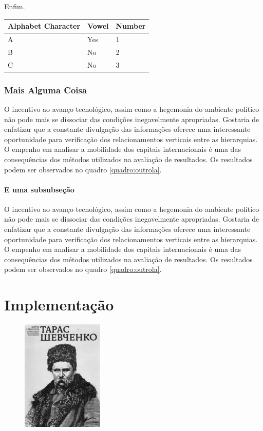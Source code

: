 \documentclass[font=plain,chapter=TITLE,section=Title,espaco=duplo,tocpage=plain,appendix=Name,floatnumber=continuous]{abnt}
\begin{document}
Enfim.

\begin{table}
\centering
\begin{tabular}{lll}
\hline
Alphabet Character & Vowel & Number \\
\hline
A & Yes & 1 \\
B & No & 2 \\
C & No & 3 \\
\hline
\end{tabular}
\end{table}

\subsection{Mais Alguma Coisa}

O incentivo ao avanço tecnológico, assim como a hegemonia do ambiente político
não pode mais se dissociar das condições inegavelmente apropriadas. Gostaria de
enfatizar que a constante divulgação das informações oferece uma interessante
oportunidade para verificação dos relacionamentos verticais entre as
hierarquias. O empenho em analisar a mobilidade dos capitais internacionais é
uma das consequências dos métodos utilizados na avaliação de resultados. Os
resultados podem ser observados no quadro \ref{quadro:outrola}.

\subsubsection{E uma subsubseção}

O incentivo ao avanço tecnológico, assim como a hegemonia do ambiente político
não pode mais se dissociar das condições inegavelmente apropriadas. Gostaria de
enfatizar que a constante divulgação das informações oferece uma interessante
oportunidade para verificação dos relacionamentos verticais entre as
hierarquias. O empenho em analisar a mobilidade dos capitais internacionais é
uma das consequências dos métodos utilizados na avaliação de resultados. Os
resultados podem ser observados no quadro \ref{quadro:outrola}.

\chapter{Implementação}

\begin{figure}[h!]
  \centering
  \includegraphics{img/taras.png}
  \label{fig:shevchenko}
\end{figure}
\end{document}
